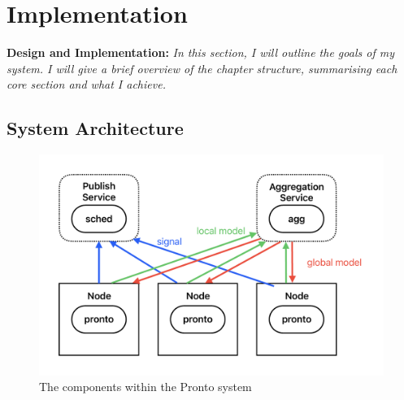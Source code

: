 \chapter{Implementation}
\begin{tcolorbox}[boxsep=0mm,left=2.5mm,right=2.5mm]
    \textbf{Design and Implementation:} {\em In this section, I will outline the
    goals of my system. I will give a brief overview of the chapter structure,
    summarising each core section and what I achieve.}
\end{tcolorbox}

\section{System Architecture}
\label{sec:sys-arch}
\begin{figure}[h]
    \centering
    \includegraphics[width=\textwidth]{images/system.pdf}
    \caption{The components within the Pronto system}
    \label{pronto-system}
\end{figure}

